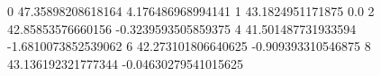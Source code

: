 0 47.35898208618164 4.176486968994141
1 43.1824951171875 0.0
2 42.85853576660156 -0.3239593505859375
4 41.501487731933594 -1.6810073852539062
6 42.273101806640625 -0.909393310546875
8 43.136192321777344 -0.04630279541015625
